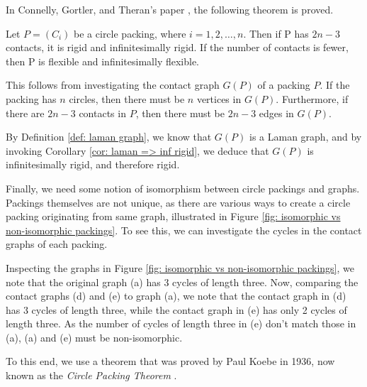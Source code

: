 \begin{flushleft}
In Connelly, Gortler, and Theran's paper \cite{sticky}, the following theorem is proved.
\end{flushleft}

\begin{theorem}
Let $P = (C_i)$ be a circle packing, where $i = 1,2,\hdots, n$. Then if P has $2n-3$ contacts, it is rigid and infinitesimally rigid. If the number of contacts is fewer, then P is flexible and infinitesimally flexible.
\end{theorem}

\begin{flushleft}
This follows from investigating the contact graph $G(P)$ of a packing $P$. If the packing has $n$ circles, then there must be $n$ vertices in $G(P)$. Furthermore, if there are $2n-3$ contacts in $P$, then there must be $2n-3$ edges in $G(P)$.
\end{flushleft}

\begin{flushleft}
By Definition \ref{def: laman graph}, we know that $G(P)$ is a Laman graph, and by invoking Corollary \ref{cor: laman => inf rigid}, we deduce that $G(P)$ is infinitesimally rigid, and therefore rigid. 
\end{flushleft}

\begin{flushleft}
Finally, we need some notion of isomorphism between circle packings and graphs. Packings themselves are not unique, as there are various ways to create a circle packing originating from same graph, illustrated in Figure \ref{fig: isomorphic vs non-isomorphic packings}. To see this, we can investigate the cycles in the contact graphs of each packing. 
\end{flushleft}

\begin{flushleft}
Inspecting the graphs in Figure \ref{fig: isomorphic vs non-isomorphic packings}, we note that the original graph (a) has 3 cycles of length three. Now, comparing the contact graphs (d) and (e) to graph (a), we note that the contact graph in (d) has 3 cycles of length three, while the contact graph in (e) has only 2 cycles of length three. As the number of cycles of length three in (e) don't match those in (a), (a) and (e) must be non-isomorphic.
\end{flushleft}

\begin{flushleft}
To this end, we use a theorem that was proved by Paul Koebe in 1936, now known as the \textit{Circle Packing Theorem} \cite{circle_packing_theorem}.
\end{flushleft}

